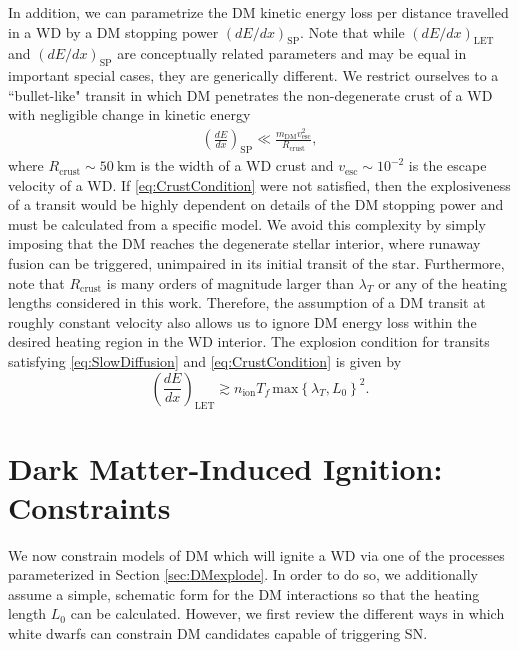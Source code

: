 \documentclass[twocolumn,showpacs,preprintnumbers,amsmath,amssymb,prd]{revtex4}
\begin{document}
In addition, we can parametrize the DM kinetic energy loss per distance travelled in a WD by a DM stopping power $(dE/dx)_\text{SP}$. 
Note that while $(dE/dx)_\text{LET}$ and $(dE/dx)_\text{SP}$ are conceptually related parameters and may be equal in important special cases, they are generically different.
We restrict ourselves to a ``bullet-like" transit in which DM penetrates the non-degenerate crust of a WD with negligible change in kinetic energy
\begin{align}
\label{eq:CrustCondition}
  \left( \frac{d E}{d x} \right)_\text{SP} \ll 
  \frac{m_\text{DM} v^2_\text{esc}}{R_\text{crust}},
\end{align}
where $R_\text{crust} \sim 50 ~\text{km}$ is the width of a WD crust and $v_\text{esc} \sim 10^{-2}$ is the escape velocity of a WD. 
If \eqref{eq:CrustCondition} were not satisfied, then the explosiveness of a transit would be highly dependent on details of the DM stopping power and must be calculated from a specific model.
We avoid this complexity by simply imposing that the DM reaches the degenerate stellar interior, where runaway fusion can be triggered, unimpaired in its initial transit of the star. 
Furthermore, note that $R_\text{crust}$ is many orders of magnitude larger than $\lambda_T$ or any of the heating lengths considered in this work. 
Therefore, the assumption of a DM transit at roughly constant velocity also allows us to ignore DM energy loss within the desired heating region in the WD interior. 
The explosion condition for transits satisfying \eqref{eq:SlowDiffusion} and \eqref{eq:CrustCondition} is given by
\begin{equation}
\label{eq:transitexplosion}
  \left( \frac{d E}{d x} \right)_\text{LET} \gtrsim n_\text{ion} T_f\, \text{max}\left\{\lambda_T, L_0 \right\}^2.
\end{equation}

\section{Dark Matter-Induced Ignition: Constraints}
\label{sec:Constraints}

We now constrain models of DM which will ignite a WD via one of the processes parameterized in Section \ref{sec:DMexplode}.
In order to do so, we additionally assume a simple, schematic form for the DM interactions so that the heating length $L_0$ can be calculated. 
However, we first review the different ways in which white dwarfs can constrain DM candidates capable of triggering SN. 
\end{document}
